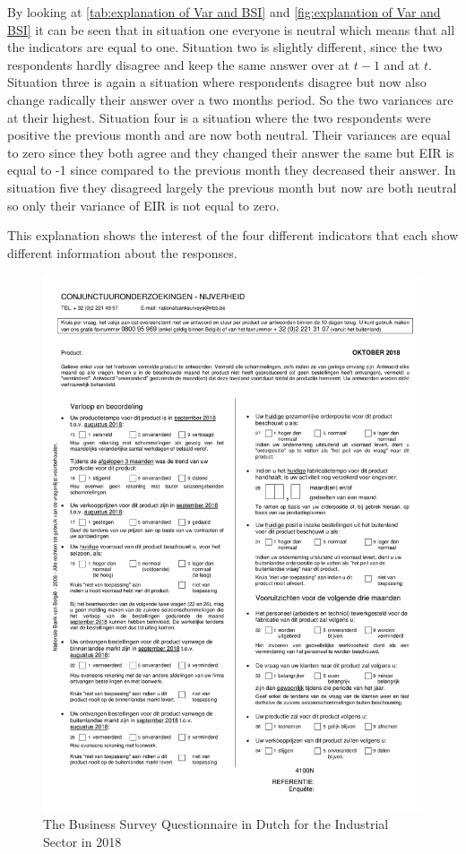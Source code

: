 \documentclass[12pt,a4paper,oneside]{book}
\begin{document}
By looking at \autoref{tab:explanation of Var and BSI} and \autoref{fig:explanation of Var and BSI} it can be seen that in situation one everyone is neutral which means that all the indicators are equal to one.
Situation two is slightly different, since the two respondents hardly disagree and keep the same answer over at $t-1$ and at $t$.
Situation three is again a situation where respondents disagree but now also change radically their answer over a two months period. So the two variances are at their highest.
Situation four is a situation where the two respondents were positive the previous month and are now both neutral. Their variances are equal to zero since they both agree and they changed their answer the same but EIR is equal to -1 since compared to the previous month they decreased their answer.
In situation five they disagreed largely the previous month but now are both neutral so only their variance of EIR is not equal to zero.

This explanation shows the interest of the four different indicators that each show different information about the responses.



\newpage
\begin{figure}[H]
    \centering
    \includegraphics[scale=0.75]{Images/IndustryN.pdf}
    \caption{The Business Survey Questionnaire in Dutch for the Industrial Sector in 2018}
    \label{Questionnaire2018}
\end{figure}
\end{document}
